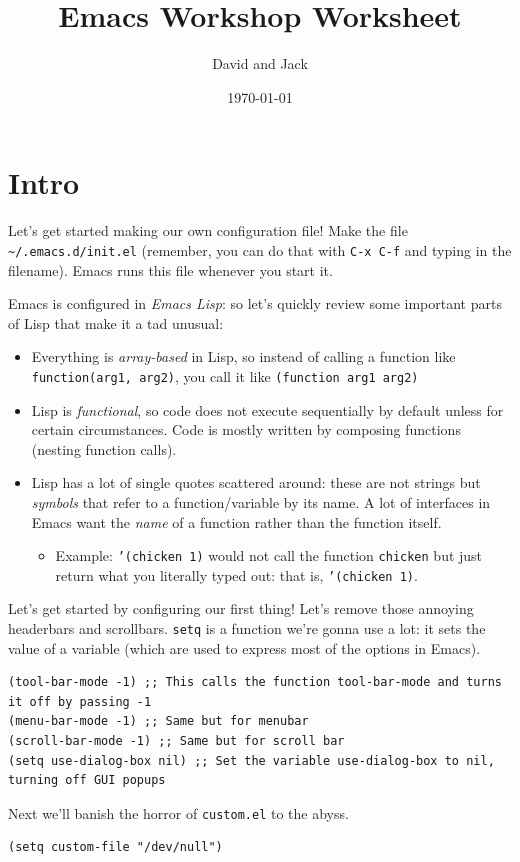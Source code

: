 \documentclass[letterpaper]{article}
\author{David and Jack}
\date{\today}
\title{Emacs Workshop Worksheet}
\renewcommand{\tableofcontents}{}
\begin{document}
\tableofcontents


\section{Intro}
\label{sec:org4650049}

Let's get started making our own configuration file! Make the file \texttt{\textasciitilde{}/.emacs.d/init.el} (remember, you can do that with \texttt{C-x C-f} and typing in the filename). Emacs runs this file whenever you start it.

Emacs is configured in \emph{Emacs Lisp}: so let's quickly review some important parts of Lisp that make it a tad unusual:
\begin{itemize}
\item Everything is \emph{array-based} in Lisp, so instead of calling a function like \texttt{function(arg1, arg2)}, you call it like \texttt{(function arg1 arg2)}
\item Lisp is \emph{functional}, so code does not execute sequentially by default unless for certain circumstances. Code is mostly written by composing functions (nesting function calls).
\item Lisp has a lot of single quotes scattered around: these are not strings but \emph{symbols} that refer to a function/variable by its name. A lot of interfaces in Emacs want the \emph{name} of a function rather than the function itself.
\begin{itemize}
\item Example: \texttt{'(chicken 1)} would not call the function \texttt{chicken} but just return what you literally typed out: that is, \texttt{'(chicken 1)}.
\end{itemize}
\end{itemize}

Let's get started by configuring our first thing! Let's remove those annoying headerbars and scrollbars. \texttt{setq} is a function we're gonna use a lot: it sets the value of a variable (which are used to express most of the options in Emacs). 
\begin{verbatim}
(tool-bar-mode -1) ;; This calls the function tool-bar-mode and turns it off by passing -1
(menu-bar-mode -1) ;; Same but for menubar
(scroll-bar-mode -1) ;; Same but for scroll bar
(setq use-dialog-box nil) ;; Set the variable use-dialog-box to nil, turning off GUI popups
\end{verbatim}

Next we'll banish the horror of \texttt{custom.el} to the abyss. 
\begin{verbatim}
(setq custom-file "/dev/null")
\end{verbatim}
\end{document}
